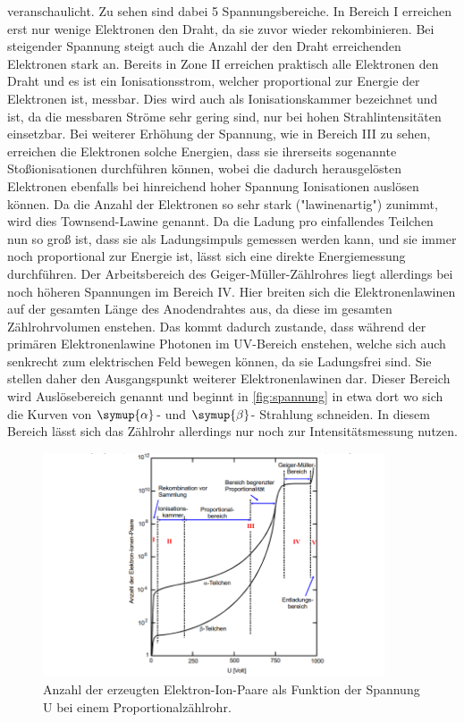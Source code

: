 veranschaulicht. Zu sehen sind dabei 5 Spannungsbereiche. In Bereich I erreichen erst nur wenige Elektronen den Draht, da sie zuvor
wieder rekombinieren. Bei steigender Spannung steigt auch die Anzahl der den Draht erreichenden Elektronen stark an. Bereits in Zone II
erreichen praktisch alle Elektronen den Draht und es ist ein Ionisationsstrom, welcher proportional zur Energie der Elektronen ist, messbar.
Dies wird auch als Ionisationskammer bezeichnet und ist, da die messbaren Ströme sehr gering sind, nur bei hohen Strahlintensitäten einsetzbar.
Bei weiterer Erhöhung der Spannung, wie in Bereich III zu sehen, erreichen die Elektronen solche Energien, dass sie ihrerseits sogenannte
Stoßionisationen durchführen können, wobei die dadurch herausgelösten Elektronen ebenfalls bei hinreichend hoher Spannung Ionisationen
auslösen können. Da die Anzahl der Elektronen so sehr stark ("lawinenartig") zunimmt, wird dies Townsend-Lawine genannt. Da die
Ladung pro einfallendes Teilchen nun so groß ist, dass sie als Ladungsimpuls gemessen werden kann, und sie immer noch proportional zur
Energie ist, lässt sich eine direkte Energiemessung durchführen.
Der Arbeitsbereich des Geiger-Müller-Zählrohres liegt allerdings bei noch höheren Spannungen im Bereich IV. Hier breiten
sich die Elektronenlawinen auf der gesamten Länge des Anodendrahtes aus, da diese im gesamten Zählrohrvolumen
enstehen. Das kommt dadurch zustande, dass während der primären Elektronenlawine Photonen im UV-Bereich enstehen, welche sich auch senkrecht
zum elektrischen Feld bewegen können, da sie Ladungsfrei sind. Sie stellen daher den Ausgangspunkt weiterer Elektronenlawinen dar.
Dieser Bereich wird Auslösebereich genannt und beginnt in \autoref{fig:spannung} in etwa dort wo sich die Kurven von $\symup{\alpha}$- und
$\symup{\beta}$- Strahlung schneiden.
In diesem Bereich lässt sich das Zählrohr allerdings nur noch zur Intensitätsmessung nutzen.
\begin{figure}
    \centering
    \includegraphics[width=0.9\textwidth]{content/bereich.png}
    \caption{Anzahl der erzeugten Elektron-Ion-Paare als Funktion der Spannung U bei einem Proportionalzählrohr.}
    \label{fig:spannung}
\end{figure}
